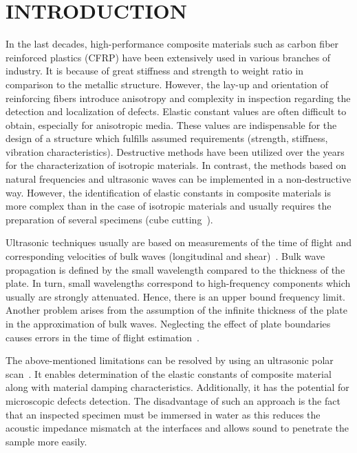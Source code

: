 \documentclass[]{spie}  %
\begin{document}
\section{}
\section[\DIFadd{short title}]{}

\section{INTRODUCTION}
\label{sec:intro}  %
In the last decades, high-performance composite materials such as carbon fiber reinforced plastics (CFRP) have been extensively used in various branches of industry.
It is because of great stiffness and strength to weight ratio in comparison to the metallic structure. 
However, the lay-up and orientation of reinforcing fibers introduce anisotropy and complexity in inspection regarding the detection and localization of defects.
Elastic constant values are often difficult to obtain, especially for anisotropic media.
These values are indispensable for the design of a structure which fulfills assumed 
requirements (strength, stiffness, vibration characteristics). 
Destructive methods have been utilized over the years for the characterization of isotropic materials. 
In contrast, the methods based on natural frequencies and ultrasonic waves can be implemented in a non-destructive way. 
However, the identification of elastic constants in composite materials is more complex than in the case of isotropic materials and usually requires the preparation of several specimens (cube cutting~\cite{Ditri1993}).

Ultrasonic techniques usually are based on measurements of the time of flight and corresponding velocities of bulk waves (longitudinal and shear)~\cite{Castellano2014}.
Bulk wave propagation is defined by the small wavelength compared to the thickness of the plate. 
In turn, small wavelengths correspond to high-frequency components which usually are strongly attenuated. 
Hence, there is an upper bound frequency limit.
Another problem arises from the assumption of the infinite thickness of the plate in the approximation of bulk waves. 
Neglecting the effect of plate boundaries causes errors in the time of flight estimation~\cite{Martens2017}. 

The above-mentioned limitations can be resolved by using an ultrasonic polar scan~\cite{Martens2019a}.
It enables determination of the elastic constants of composite material along with material damping characteristics.
Additionally, it has the potential for microscopic defects detection.
The disadvantage of such an approach is the fact that an inspected specimen must be immersed in water as this reduces the acoustic impedance mismatch at the
interfaces and allows sound to penetrate the sample more easily.
\end{document}
